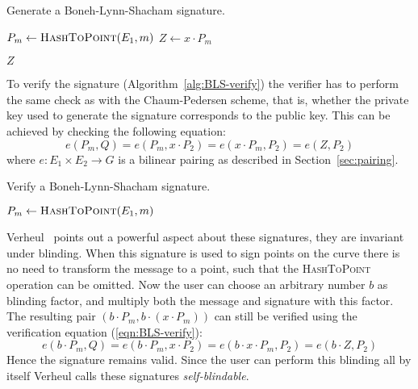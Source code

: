 \begin{algorithm}[t]
  \caption{Generate a Boneh-Lynn-Shacham signature.}
  \label{alg:BLS-sign}
  \addtolength{\baselineskip}{1mm}
  \begin{algorithmic}[1]
      \State $P_m \gets \Call{HashToPoint}{E_1, m}$
      \State $Z \gets x \cdot P_m$

      \Return $Z$
    \EndFunction
  \end{algorithmic}
\end{algorithm}

To verify the signature (Algorithm~\ref{alg:BLS-verify}) the verifier has to perform
the same check as with the Chaum-Pedersen scheme, that is, whether the private
key used to generate the signature corresponds to the public key. This can be
achieved by checking the following equation:
\begin{equation}\label{eqn:BLS-verify}
  e(P_m, Q) = e(P_m, x \cdot P_2) = e(x \cdot P_m, P_2) = e(Z, P_2)
\end{equation}
where $e: E_1 \times E_2 \to G$ is a bilinear pairing as described in
Section~\ref{sec:pairing}.

\begin{algorithm}[t]
  \caption{Verify a Boneh-Lynn-Shacham signature.}
  \label{alg:BLS-verify}
  \addtolength{\baselineskip}{1mm}
  \begin{algorithmic}[1]
      \State $P_m \gets \Call{HashToPoint}{E_1, m}$
      \Return {}
      \EndIf

      \Return {}
    \EndFunction
  \end{algorithmic}
\end{algorithm}

Verheul~\cite{Verheul01} points out a powerful aspect about these signatures,
they are invariant under blinding. When this signature is used to sign points on
the curve there is no need to transform the message to a point, such that the
\textsc{HashToPoint} operation can be omitted. Now the user can choose an
arbitrary number $b$ as blinding factor, and multiply both the message and
signature with this factor. The resulting pair
$(b \cdot P_m, b \cdot (x \cdot P_m))$ can still be verified using the
verification equation (\ref{eqn:BLS-verify}):
$$e(b \cdot P_m, Q) = e(b \cdot P_m, x \cdot P_2) =
e(b \cdot x \cdot P_m, P_2) = e(b \cdot Z, P_2)$$
Hence the signature remains valid. Since the user can perform this blinding all
by itself Verheul calls these signatures \emph{self-blindable}.

